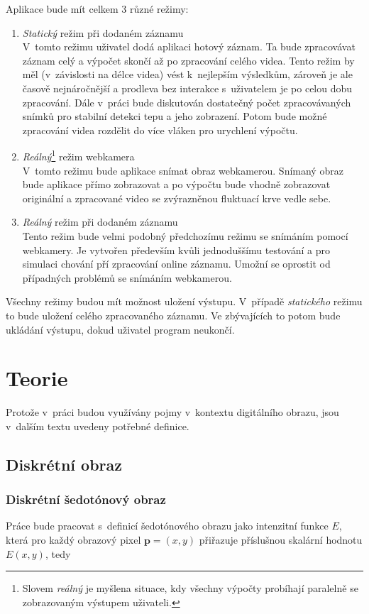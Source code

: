 \documentclass[
  digital, %
  table,   %
%
  lof,     %
  lot,     %
]{fithesis3}
\begin{document}
Aplikace bude mít celkem 3 různé režimy:
\begin{enumerate}
  \item \emph{Statický} režim při dodaném záznamu \\
    V~tomto režimu uživatel dodá aplikaci hotový záznam. Ta bude zpracovávat záznam celý a výpočet skončí až po zpracování celého videa. Tento režim by měl (v~závislosti na délce videa) vést k~nejlepším výsledkům, zároveň je ale časově nejnáročnější a prodleva bez interakce s~uživatelem je po celou dobu zpracování. Dále v~práci bude diskutován dostatečný počet zpracovávaných snímků pro stabilní detekci tepu a jeho zobrazení. Potom bude možné zpracování videa rozdělit do více vláken pro urychlení výpočtu.
    \item \emph{Reálný}\footnote{Slovem \emph{reálný} je myšlena situace, kdy všechny výpočty probíhají paralelně se zobrazovaným výstupem uživateli.} režim webkamera \\ 
    V~tomto režimu bude aplikace snímat obraz webkamerou. Snímaný obraz bude aplikace přímo zobrazovat a po výpočtu bude vhodně zobrazovat originální a zpracované video se zvýrazněnou fluktuací krve vedle sebe.
  \item \emph{Reálný} režim při dodaném záznamu \\
    Tento režim bude velmi podobný předchozímu režimu se snímáním pomocí webkamery. Je vytvořen především kvůli jednoduššímu testování a pro simulaci chování pří zpracování online záznamu. Umožní se oprostit od případných problémů se snímáním webkamerou.
\end{enumerate}

Všechny režimy budou mít možnost uložení výstupu. V~případě \emph{statického} režimu to bude uložení celého zpracovaného záznamu. Ve zbývajících to potom bude ukládání výstupu, dokud uživatel program neukončí.

\chapter{Teorie}
Protože v~práci budou využívány pojmy v~kontextu digitálního obrazu, jsou v~dalším textu uvedeny potřebné definice.
\section{Diskrétní obraz} 
\subsection{Diskrétní šedotónový obraz}
Práce bude pracovat s~definicí šedotónového obrazu jako intenzitní funkce $E$, která pro každý obrazový pixel $\mathbf{p} = (x,y)$ přiřazuje příslušnou skalární hodnotu $E(x,y)$, tedy
\end{document}

